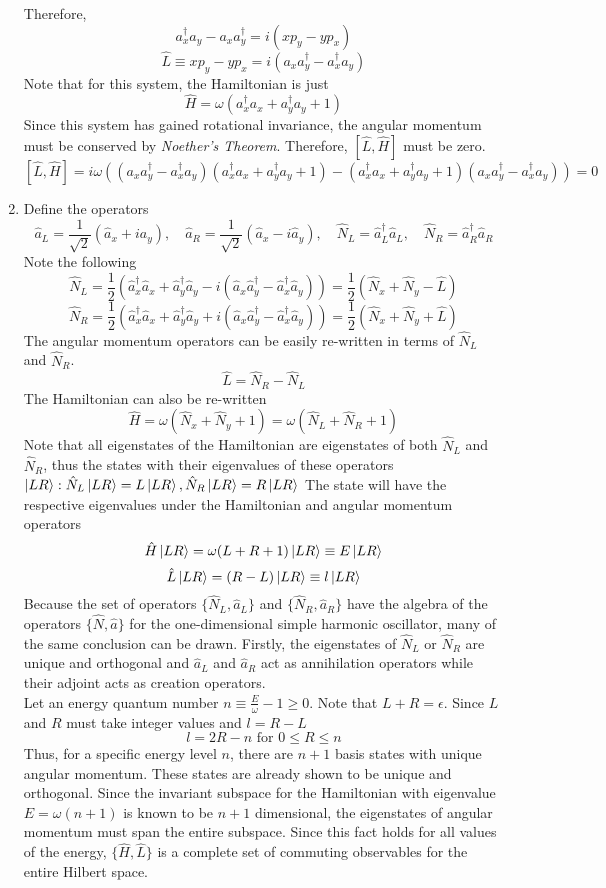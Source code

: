 \begin{sol}
\begin{enumerate}[label=\textbf{(\alph*)}]
Therefore,
$$a_x^\dagger a_y-a_xa_y^\dagger=i(xp_y-yp_x)$$
$$\hat L\equiv xp_y-yp_x=i(a_x a_y^\dagger-a_x^\dagger a_y) $$ 
Note that for this system, the Hamiltonian is just 
$$\hat H=\omega(a_x^\dagger a_x+a_y^\dagger a_y+1)$$ 
Since this system has gained rotational invariance, the angular momentum must be conserved by \textit{Noether's Theorem}. Therefore, $[\hat L,\hat H]$ must be zero.
$$[\hat L,\hat H]=i\omega\left((a_x a_y^\dagger-a_x^\dagger a_y)(a_x^\dagger a_x+a_y^\dagger a_y+1)-(a_x^\dagger a_x+a_y^\dagger a_y+1)(a_x a_y^\dagger-a_x^\dagger a_y)\right)=0$$
\item
Define the operators
$$\hat a_L=\frac{1}{\sqrt{2}}(\hat a_x+ia_y),\,\,\,\,\,\,\hat a_R=\frac{1}{\sqrt{2}}(\hat a_x-i\hat a_y),\,\,\,\,\,\,\hat N_L=\hat a_L^\dagger\hat a_L,\,\,\,\,\,\,\hat N_R=\hat a_R^\dagger\hat a_R$$
Note the following
$$\hat N_L=\frac{1}{2}\left(\hat a_x^\dagger\hat a_x+\hat a_y^\dagger\hat a_y-i(\hat a_x\hat a_y^\dagger-\hat a_x^\dagger\hat a_y)\right)=\frac{1}{2}(\hat N_x+\hat N_y-\hat L)$$
$$\hat N_R=\frac{1}{2}\left(\hat a_x^\dagger\hat a_x+\hat a_y^\dagger\hat a_y+i(\hat a_x\hat a_y^\dagger-\hat a_x^\dagger\hat a_y)\right)=\frac{1}{2}(\hat N_x+\hat N_y+\hat L)$$
The angular momentum operators can be easily re-written in terms of $\hat N_L$ and $\hat N_R$.
$$\hat L=\hat N_R-\hat N_L$$ 
The Hamiltonian can also be re-written
$$\hat H=\omega(\hat N_x+\hat N_y+1)=\omega(\hat N_L+\hat N_R+1)$$ 
Note that all eigenstates of the Hamiltonian are eigenstates of both $\hat N_L$ and $\hat N_R$, thus the states with their eigenvalues of these operators $\ket{LR}:\hat N_L\ket{LR}=L\ket{LR},\hat N_R\ket{LR}=R\ket{LR}$ 
The state will have the respective eigenvalues under the Hamiltonian and angular momentum operators
$$\hat H\ket{LR}=\omega(L+R+1)\ket{LR}\equiv E\ket{LR}$$
$$\hat L\ket{LR}=(R-L)\ket{LR}\equiv l\ket{LR}$$ 
Because the set of operators $\{\hat N_L,\hat a_L\}$ and $\{\hat N_R,\hat a_R\}$ have the algebra of the operators $\{\hat N,\hat a\}$ for the one-dimensional simple harmonic oscillator, many of the same conclusion can be drawn. Firstly, the eigenstates of $\hat N_L$ or $\hat N_R$ are unique and orthogonal and $\hat a_L$ and $\hat a_R$ act as annihilation operators while their adjoint acts as creation operators.\\
Let an energy quantum number $n\equiv\frac{E}{\omega}-1\geq 0$. Note that $L+R=\epsilon$. Since $L$ and $R$ must take integer values and $l=R-L$
$$l=2R-n\text{ for }0\leq R\leq n$$  
Thus, for a specific energy level $n$, there are $n+1$ basis states with unique angular momentum. These states are already shown to be unique and orthogonal. Since the invariant subspace for the Hamiltonian with eigenvalue $E=\omega(n+1)$ is known to be $n+1$ dimensional, the eigenstates of angular momentum must span the entire subspace. Since this fact holds for all values of the energy, $\{\hat H,\hat L\}$ is a complete set of commuting observables for the entire Hilbert space.
\end{enumerate}
\end{sol}